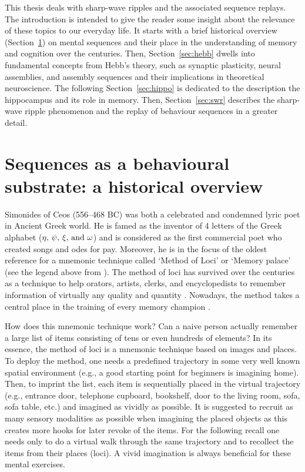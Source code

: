   This thesis deals with sharp-wave ripples and the associated sequence
  replays. The introduction is intended to give the reader some insight about
  the relevance of these topics to our everyday life. It starts with a brief
  historical overview (Section~\ref{sec:seqs}) on mental sequences and their
  place in the understanding of memory and cognition over the centuries. Then,
  Section~\ref{sec:hebb} dwells into fundamental concepts from Hebb's theory,
  such as synaptic plasticity, neural assemblies, and assembly sequences and
  their implications in theoretical neuroscience. The following
  Section~\ref{sec:hippo} is dedicated to the description the hippocampus and
  its role in memory. Then, Section~\ref{sec:swr} describes the sharp-wave
  ripple phenomenon and the replay of behaviour sequences in a greater detail.

\section{Sequences as a behavioural substrate: a historical overview}
\label{sec:seqs}
  Simonides of Ceos (556--468 BC) was both a celebrated and condemned lyric
  poet in Ancient Greek world. He is famed as the inventor of 4 letters of the
  Greek alphabet ($\eta, \, \psi, \, \xi,\,{\rm and } \,\, \omega$) and is
  considered as the first commercial poet who created songs and odes for pay.
  Moreover, he is in the focus of the oldest reference \citep{Rhetorica} for a
  mnemonic technique called `Method of Loci' or `Memory palace' (see the legend
  above from \cite{Cicero}). The method of loci has survived over the centuries
  as a technique to help orators, artists, clerks, and encyclopedists to
  remember information of virtually any quality and quantity \citep{Yates66}.
  Nowadays, the method takes a central place in the training of every memory
  champion \citep{Foer2011}.
  
  How does this mnemonic technique work? Can a naive person actually remember a
  large list of items consisting of tens or even hundreds of elements? In its
  essence, the method of loci is a mnemonic technique based on images and
  places. To deploy the method, one needs a predefined trajectory in some very
  well known spatial environment (e.g., a good starting point for beginners is
  imagining home). Then, to imprint the list, each item is sequentially placed
  in the virtual trajectory (e.g., entrance door, telephone cupboard,
  bookshelf, door to the living room, sofa, sofa table, etc.) and imagined as
  vividly as possible. It is suggested to recruit as many sensory modalities as
  possible when imagining the placed objects as this creates more hooks for
  later revoke of the items. For the following recall one needs only to do a
  virtual walk through the same trajectory and to recollect the items from
  their places (loci). A vivid imagination is always beneficial for these
  mental exercises.

